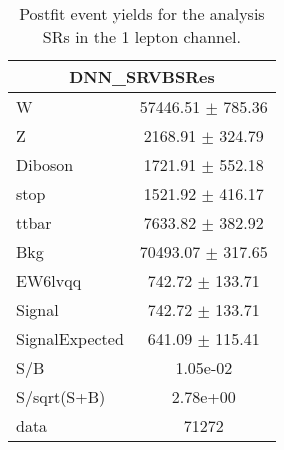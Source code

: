 \begin{table}
\begin{tabular}{|l|c|}
\hline
 \multicolumn{2}{|c|}{DNN\_SRVBSRes}\\ \hline
W & 57446.51 $\pm$ 785.36\\
Z & 2168.91 $\pm$ 324.79\\
Diboson & 1721.91 $\pm$ 552.18\\
stop & 1521.92 $\pm$ 416.17\\
ttbar & 7633.82 $\pm$ 382.92\\
\hline
Bkg & 70493.07 $\pm$ 317.65\\
\hline
EW6lvqq & 742.72 $\pm$ 133.71\\
\hline
Signal & 742.72 $\pm$ 133.71\\
SignalExpected & 641.09 $\pm$ 115.41\\
\hline
S/B & 1.05e-02\\
S/sqrt(S+B) & 2.78e+00\\
\hline
data & 71272\\ \hline
\end{tabular}
\caption{Postfit event yields for the analysis SRs in the 1 lepton channel.}
\label{tab:1lepPostfitYield_SR}
\end{table}


